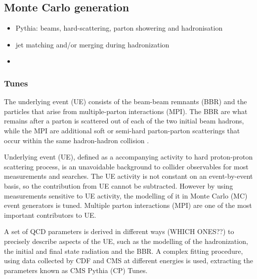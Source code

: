 \documentclass[11pt]{article}
\begin{document}
\subsection{Monte Carlo generation}
\label{sec:org9b66a3c}
\begin{itemize}
\item Pythia: beams, hard-scattering, parton showering and hadronisation
\item jet matching and/or merging during hadronization
\item 
\end{itemize}

\subsubsection{Tunes}
\label{sec:orgfff1994}
The underlying event (UE) consists of the beam-beam remnants (BBR) and the particles that arise from multiple-parton interactions (MPI).
The BBR are what remains after a parton is scattered out of each of the two initial beam hadrons, while the MPI are additional soft or semi-hard parton-parton scatterings that occur within the same hadron-hadron collision \cite{CMS_Tunes}.

Underlying event (UE), defined as a accompanying activity to hard proton-proton scattering process,
is an unavoidable background to collider observables for most measurements and searches. The UE
activity is not constant on an event-by-event basis, so the contribution from UE cannot be subtracted.
However by using measurements sensitive to UE activity, the modelling of it in Monte Carlo (MC) event
generators is tuned. Multiple parton interactions (MPI) are one of the most important contributors to UE. \cite{hllhc_physics}

A set of QCD parameters is derived in different ways (WHICH ONES??) to precisely describe aspects of the UE, such as the modelling of the hadronization, the initial and final state radiation and the BBR.
A complex fitting procedure, using data collected by CDF and CMS at different energies is used, extracting the parameters known as CMS Pythia (CP) Tunes.
\end{document}
